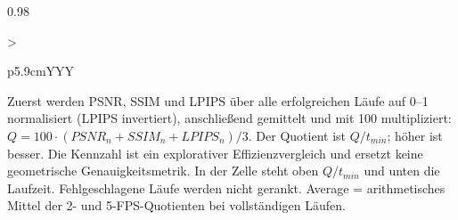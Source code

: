 \documentclass[a4paper,landscape]{article}
\begin{document}
\begin{center}
\begin{tabularx}{0.98\linewidth}{>{\raggedright\arraybackslash}p{5.9cm}YYY}
\bottomrule
\end{tabularx}
\vspace{7pt}
\begin{minipage}{0.98\linewidth}\scriptsize Zuerst werden PSNR, SSIM und LPIPS über alle erfolgreichen Läufe auf 0--1 normalisiert (LPIPS invertiert), anschließend gemittelt und mit 100 multipliziert: $Q=100\cdot(PSNR_n+SSIM_n+LPIPS_n)/3$. Der Quotient ist $Q/t_{min}$; höher ist besser. Die Kennzahl ist ein explorativer Effizienzvergleich und ersetzt keine geometrische Genauigkeitsmetrik. In der Zelle steht oben $Q/t_{min}$ und unten die Laufzeit. Fehlgeschlagene Läufe werden nicht gerankt. Average = arithmetisches Mittel der 2- und 5-FPS-Quotienten bei vollständigen Läufen.\end{minipage}
\end{center}
\end{document}
